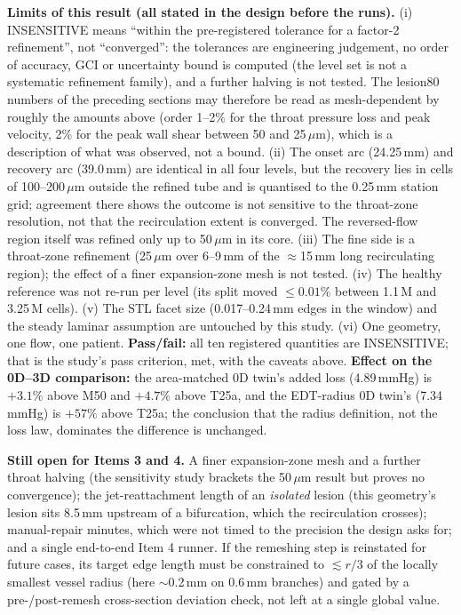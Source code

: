 \documentclass[11pt]{article}
\begin{document}
\textbf{Limits of this result (all stated in the design before the runs).} (i) INSENSITIVE means ``within the pre-registered tolerance for a factor-2 refinement'', not ``converged'': the tolerances are engineering judgement, no order of accuracy, GCI or uncertainty bound is computed (the level set is not a systematic refinement family), and a further halving is not tested. The lesion80 numbers of the preceding sections may therefore be read as mesh-dependent by roughly the amounts above
(order 1--2\% for the throat pressure loss and peak velocity, 2\% for the peak wall shear between 50 and 25\,$\mu$m), which is a description of what was observed, not a bound.
(ii) The onset arc (24.25\,mm) and recovery arc (39.0\,mm) are identical in all four levels, but the recovery lies in cells of 100--200\,$\mu$m outside the refined tube and is quantised to the 0.25\,mm station grid; agreement there shows the outcome is not sensitive to the throat-zone resolution, not that the recirculation extent is converged. The reversed-flow region itself was refined only up to 50\,$\mu$m in its core.
(iii) The fine side is a throat-zone refinement (25\,$\mu$m over 6--9\,mm of the $\approx$15\,mm long recirculating region); the effect of a finer expansion-zone mesh is not tested. (iv) The healthy reference was not re-run per level (its split moved $\leq0.01\%$ between 1.1\,M and 3.25\,M cells). (v) The STL facet size (0.017--0.24\,mm edges in the window) and the steady laminar assumption are untouched by this study.
(vi) One geometry, one flow, one patient. \textbf{Pass/fail:} all ten registered quantities are INSENSITIVE; that is the study's pass criterion, met, with the caveats above.
\textbf{Effect on the 0D--3D comparison:} the area-matched 0D twin's added loss (4.89\,mmHg) is $+3.1\%$ above M50 and $+4.7\%$ above T25a, and the EDT-radius 0D twin's (7.34\,mmHg) is $+57\%$ above T25a; the conclusion that the radius definition, not the loss law, dominates the difference is unchanged.

\textbf{Still open for Items 3 and 4.} A finer expansion-zone mesh and a further throat halving (the sensitivity study brackets the 50\,$\mu$m result but proves no convergence); the jet-reattachment length of an \emph{isolated} lesion (this geometry's lesion sits 8.5\,mm upstream of a
bifurcation, which the recirculation crosses); manual-repair minutes, which were not timed to the precision the design asks for; and a single end-to-end Item 4 runner. If the remeshing step is reinstated for future cases, its target edge length must be
constrained to $\lesssim r/3$ of the locally smallest vessel radius (here $\sim$0.2\,mm on 0.6\,mm branches) and gated by a pre-/post-remesh cross-section deviation check, not left at a single global value.
\end{document}
